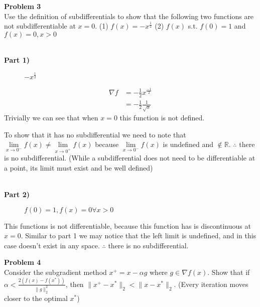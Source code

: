 \documentclass[12pt,letter]{article}
\newcommand{\problem}[1]{\vspace{3mm}\Large\textbf{{Problem {#1}\vspace{3mm}}}\normalsize\\}
\newcommand{\ppart}[1]{\vspace{2mm}\large\textbf{\\Part {#1})\vspace{2mm}}\normalsize\\}
\begin{document}
\problem{3}
Use the definition of subdifferentials to show that the following two functions 
are not subdifferentiable at $x=0$. (1) $f(x) = -x^\frac12$ (2) $f(x)$ s.t.
$f(0) = 1$ and $f(x) = 0, x>0$

\ppart{1}
\begin{figure}[h]
\centering
{}
\caption{$-x^\frac12$}
\end{figure}

\begin{align*}
    \nabla f &= -\frac12 x^\frac{-1}{2} \\
             &= -\frac12\frac{1}{\sqrt{x}}
\end{align*}
Trivially we can see that when $x=0$ this function is not defined. 

To show that it has no subdifferential we need to note that 
$\lim\limits_{x\rightarrow 0^-}f(x) \neq \lim\limits_{x\rightarrow 0^+}f(x)$ because 
$\lim\limits_{x\rightarrow 0^-}f(x)$ is undefined and $\notin \mathbb{R}$.
$\therefore$ there is no subdifferential. (While a subdifferential does not 
need to be differentiable at a point, its limit must exist and be well defined)

\ppart{2}
\begin{figure}[h]
\centering
{}
\caption{$f(0) = 1, f(x) = 0 \forall x>0$}
\end{figure}
This functions is not differentiable, because
this function has is discontinuous at $x=0$. Similar to part 1 we may notice that the
left limit is undefined, and in this case doesn't exist in any space. $\therefore$
there is no subdifferential.

\problem{4}
Consider the subgradient method $x^+=x-\alpha g$ where $g\in\nabla f(x)$. Show
that if $\alpha < \frac{2(f(x) - f(x^*))}{\|g\|_2^2}$, then $\|x^+-x^*\|_2 
< \|x-x^*\|_2$. (Every iteration moves closer to the optimal $x^*$)
\end{document}
